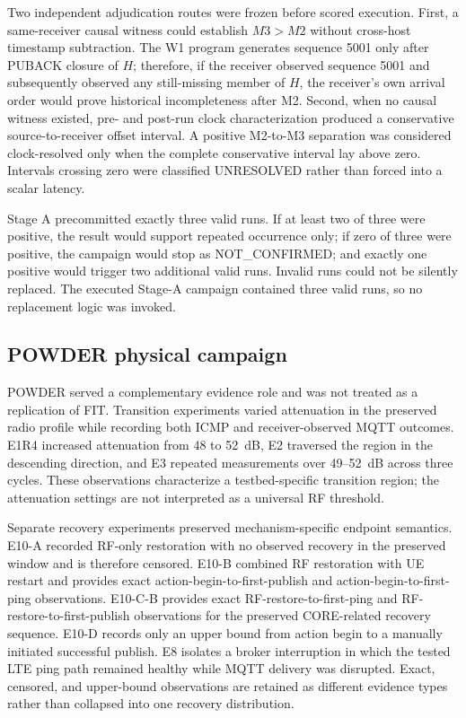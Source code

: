 \documentclass[journal]{IEEEtran}
\begin{document}
Two independent adjudication routes were frozen before scored execution. First, a same-receiver causal witness could establish $M3>M2$ without cross-host timestamp subtraction. The W1 program generates sequence 5001 only after PUBACK closure of $H$; therefore, if the receiver observed sequence 5001 and subsequently observed any still-missing member of $H$, the receiver's own arrival order would prove historical incompleteness after M2. Second, when no causal witness existed, pre- and post-run clock characterization produced a conservative source-to-receiver offset interval. A positive M2-to-M3 separation was considered clock-resolved only when the complete conservative interval lay above zero. Intervals crossing zero were classified UNRESOLVED rather than forced into a scalar latency.

Stage A precommitted exactly three valid runs. If at least two of three were positive, the result would support repeated occurrence only; if zero of three were positive, the campaign would stop as NOT\_CONFIRMED; and exactly one positive would trigger two additional valid runs. Invalid runs could not be silently replaced. The executed Stage-A campaign contained three valid runs, so no replacement logic was invoked.

\subsection{POWDER physical campaign}

POWDER \cite{powder} served a complementary evidence role and was not treated as a replication of FIT. Transition experiments varied attenuation in the preserved radio profile while recording both ICMP and receiver-observed MQTT outcomes. E1R4 increased attenuation from 48 to 52~dB, E2 traversed the region in the descending direction, and E3 repeated measurements over 49--52~dB across three cycles. These observations characterize a testbed-specific transition region; the attenuation settings are not interpreted as a universal RF threshold.

Separate recovery experiments preserved mechanism-specific endpoint semantics. E10-A recorded RF-only restoration with no observed recovery in the preserved window and is therefore censored. E10-B combined RF restoration with UE restart and provides exact action-begin-to-first-publish and action-begin-to-first-ping observations. E10-C-B provides exact RF-restore-to-first-ping and RF-restore-to-first-publish observations for the preserved CORE-related recovery sequence. E10-D records only an upper bound from action begin to a manually initiated successful publish. E8 isolates a broker interruption in which the tested LTE ping path remained healthy while MQTT delivery was disrupted. Exact, censored, and upper-bound observations are retained as different evidence types rather than collapsed into one recovery distribution.
\end{document}
